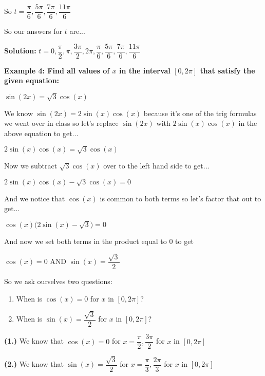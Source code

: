 \documentclass[12pt]{article}
\begin{document}
So $t =  \dfrac{\pi}{6}, \dfrac{5\pi}{6}, \dfrac{7\pi}{6}, \dfrac{11\pi}{6}$

So our answers for $t$ are...
\newline

\centerline{\textbf{Solution:} $t = 0, \dfrac{\pi}{2}, \pi, \dfrac{3\pi}{2}, 2\pi, \dfrac{\pi}{6}, \dfrac{5\pi}{6}, \dfrac{7\pi}{6}, \dfrac{11\pi}{6}$ }

\textbf{Example 4: Find all values of $x$ in the interval $[0, 2\pi]$ that satisfy the given equation:}
\newline

\centerline{$\sin(2x) = \sqrt{3}\cos(x)$}

We know $\sin(2x) = 2\sin(x)\cos(x)$ because it's one of the trig formulas we went over in class so let's replace $\sin(2x)$ with $2\sin(x)\cos(x)$ in the above equation to get...
\newline

\centerline{$2\sin(x)\cos(x) = \sqrt{3}\cos(x)$}

Now we subtract $\sqrt{3}\cos(x)$ over to the left hand side to get...
\newline

\centerline{$2\sin(x)\cos(x) - \sqrt{3}\cos(x) = 0$}

And we notice that $\cos(x)$ is common to both terms so let's factor that out to get...

\centerline{$\cos(x)\Big(2\sin(x) - \sqrt{3}\Big) = 0$}

And now we set both terms in the product equal to $0$ to get
\newline

\centerline{$\cos(x) = 0$\hspace{1cm} AND \hspace{1cm} $\sin(x) = \dfrac{\sqrt{3}}{2}$}

So we ask ourselves two questions:
\begin{enumerate}
\item When is $\cos(x) = 0$ for $x$ in $[0, 2\pi]$?
\item When is $\sin(x) = \dfrac{\sqrt{3}}{2}$ for $x$ in $[0, 2\pi]$?
\end{enumerate}

\textbf{(1.)} We know that $\cos(x) = 0$ for $x = \dfrac{\pi}{2}, \dfrac{3\pi}{2}$ for $x$ in $[0, 2\pi]$ 

\textbf{(2.)} We know that $\sin(x) = \dfrac{\sqrt{3}}{2}$ for $x = \dfrac{\pi}{3}, \dfrac{2\pi}{3}$ for $x$ in $[0, 2\pi]$ 
\end{document}
